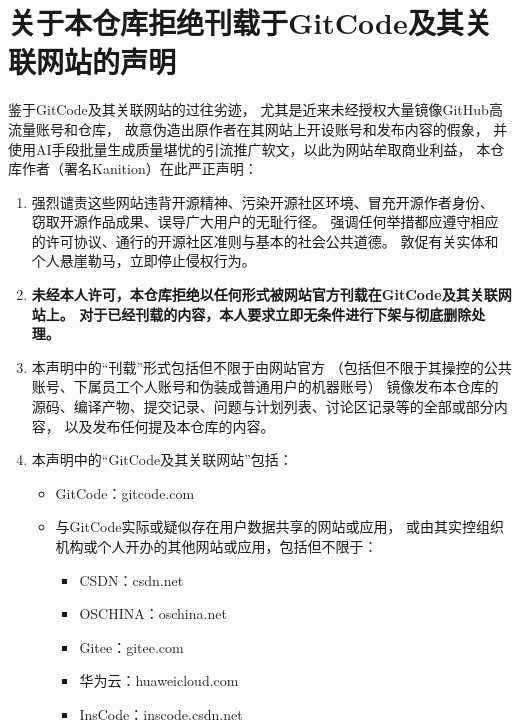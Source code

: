 \chapter[关于本仓库拒绝刊载于GitCode及其关联网站的声明]{{\LARGE 关于本仓库拒绝刊载于GitCode及其关联网站的声明}}
\label{chap:关于本仓库拒绝刊载于GitCode及其关联网站的声明}

鉴于GitCode及其关联网站的过往劣迹，
尤其是近来未经授权大量镜像GitHub高流量账号和仓库，
故意伪造出原作者在其网站上开设账号和发布内容的假象，
并使用AI手段批量生成质量堪忧的引流推广软文，以此为网站牟取商业利益，
本仓库作者（署名Kanition）在此严正声明：

\begin{enumerate}
      \item 强烈谴责这些网站违背开源精神、污染开源社区环境、冒充开源作者身份、
            窃取开源作品成果、误导广大用户的无耻行径。
            强调任何举措都应遵守相应的许可协议、通行的开源社区准则与基本的社会公共道德。
            敦促有关实体和个人悬崖勒马，立即停止侵权行为。
      \item {\bfseries 未经本人许可，本仓库拒绝以任何形式被网站官方刊载在GitCode及其关联网站上。
            对于已经刊载的内容，本人要求立即无条件进行下架与彻底删除处理。}
      \item 本声明中的“刊载”形式包括但不限于由网站官方
            （包括但不限于其操控的公共账号、下属员工个人账号和伪装成普通用户的机器账号）
            镜像发布本仓库的源码、编译产物、提交记录、问题与计划列表、讨论区记录等的全部或部分内容，
            以及发布任何提及本仓库的内容。
      \item 本声明中的“GitCode及其关联网站”包括：
            \begin{itemize}
                  \item GitCode：gitcode.com
                  \item 与GitCode实际或疑似存在用户数据共享的网站或应用，
                        或由其实控组织机构或个人开办的其他网站或应用，包括但不限于：
                        \begin{itemize}
                              \item CSDN：csdn.net
                              \item OSCHINA：oschina.net
                              \item Gitee：gitee.com
                              \item 华为云：huaweicloud.com
                              \item InsCode：inscode.csdn.net

\end{itemize}
\end{itemize}
\end{enumerate}
